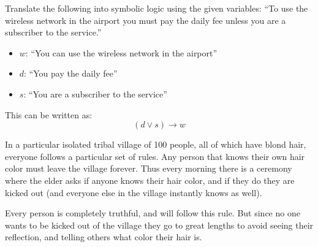 \documentclass[addpoints, answers]{exam}
\begin{document}
\begin{questions}

  \question[4] Translate the following into symbolic logic using the given
  variables: ``To use the wireless network in the airport you must pay the
  daily fee unless you are a subscriber to the service.''
  \begin{itemize}
    \item $w$: ``You can use the wireless network in the airport''

    \item $d$: ``You pay the daily fee''

    \item $s$: ``You are a subscriber to the service''
  \end{itemize}

  \begin{solution}
    This can be written as:
    \[
      (d\vee s)\rightarrow w
    \]
  \end{solution}

  \question[9] In a particular isolated tribal village of 100 people, all
  of which have blond hair, everyone follows a particular set of rules. Any
  person that knows their own hair color must leave the village forever. Thus
  every morning there is a ceremony where the elder asks if anyone knows their
  hair color, and if they do they are kicked out (and everyone else in the
  village instantly knows as well). 

  Every person is completely truthful, and will follow this rule. But since no
  one wants to be kicked out of the village they go to great lengths to avoid
  seeing their reflection, and telling others what color their hair is.


\end{questions}
\end{document}
